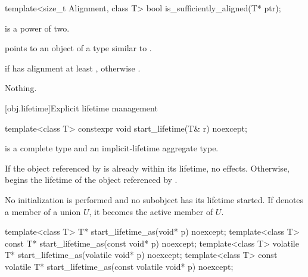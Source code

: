 %
\begin{itemdecl}
template<size_t Alignment, class T>
  bool is_sufficiently_aligned(T* ptr);
\end{itemdecl}

\begin{itemdescr}
\pnum
\mandates
{} is a power of two.

\pnum
\expects
{} points to
an object  of a type similar to .

\pnum
\returns
{} if  has alignment at least ,
otherwise .

\pnum
\throws
Nothing.
\end{itemdescr}

[obj.lifetime]{Explicit lifetime management}

%
\begin{itemdecl}
template<class T>
  constexpr void start_lifetime(T& r) noexcept;
\end{itemdecl}

\begin{itemdescr}
\pnum
\mandates
{} is a complete type and
an implicit-lifetime aggregate type.

\pnum
\effects
If the object referenced by 
is already within its lifetime,
no effects.
Otherwise, begins the lifetime of the object referenced by .
\begin{note}
No initialization is performed and no subobject has its lifetime started.
If  denotes a member of a union $U$,
it becomes the active member of $U$.
\end{note}
\end{itemdescr}

%
\begin{itemdecl}
template<class T>
  T* start_lifetime_as(void* p) noexcept;
template<class T>
  const T* start_lifetime_as(const void* p) noexcept;
template<class T>
  volatile T* start_lifetime_as(volatile void* p) noexcept;
template<class T>
  const volatile T* start_lifetime_as(const volatile void* p) noexcept;
\end{itemdecl}

